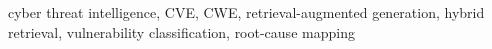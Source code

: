 \documentclass[conference,compsoc]{IEEEtran}
\begin{document}
\begin{IEEEkeywords}
cyber threat intelligence, CVE, CWE, retrieval-augmented generation, hybrid retrieval, vulnerability classification, root-cause mapping
\end{IEEEkeywords}





\end{document}
